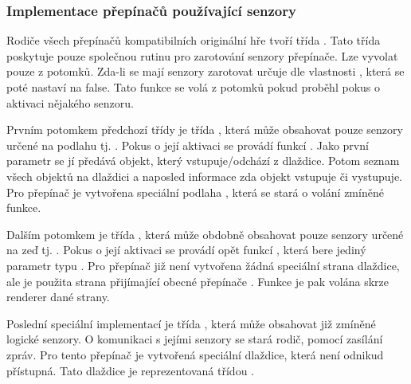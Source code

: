 \subsubsection{Implementace přepínačů používající senzory}
Rodiče všech přepínačů kompatibilních originální hře tvoří třída . Tato třída poskytuje
pouze společnou rutinu pro zarotování senzory přepínače. Lze vyvolat pouze z potomků. Zda-li se mají
senzory zarotovat určuje dle vlastnosti  , která se poté nastaví na false. Tato funkce se
volá z potomků pokud proběhl pokus o aktivaci nějakého senzoru.

Prvním potomkem předchozí třídy je třída , která může obsahovat pouze senzory určené
na podlahu tj. . Pokus o její aktivaci se provádí funkcí . Jako první parametr se jí předává objekt,
který vstupuje/odchází z dlaždice. Potom seznam všech objektů na dlaždici a naposled informace zda objekt
vstupuje či vystupuje. Pro přepínač je vytvořena speciální podlaha , která se stará 
o volání zmíněné funkce.

Dalším potomkem je třída , která může obdobně obsahovat pouze senzory určené na zeď tj. .
Pokus o její aktivaci se provádí opět funkcí , která bere jediný parametr typu . Pro přepínač
již není vytvořena žádná speciální strana dlaždice, ale je použita strana přijímající obecné přepínače .
Funkce  je pak volána skrze renderer dané strany.

Poslední speciální implementací je třída , která může obsahovat již zmíněné logické senzory.
O komunikaci s jejími senzory se stará rodič, pomocí zasílání zpráv. Pro tento přepínač je vytvořená speciální dlaždice, která není 
odnikud přístupná. Tato dlaždice je reprezentovaná třídou . 

